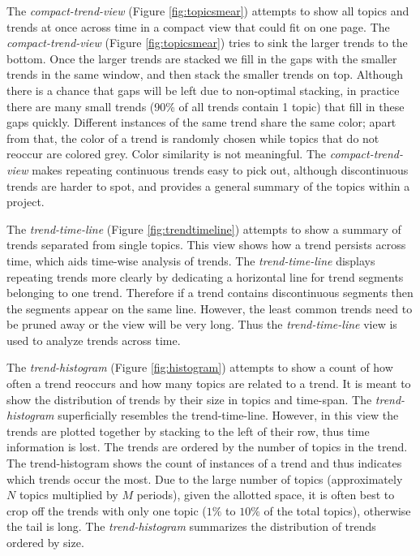 \documentclass[times, 10pt,twocolumn]{article}
\begin{document}
 The \emph{compact-trend-view} (Figure \ref{fig:topicsmear})
  attempts to show all topics and trends at once across time in a
  compact view that could fit on one page.   The
\emph{compact-trend-view} (Figure \ref{fig:topicsmear}) tries to sink
the larger trends to the bottom.  Once the larger trends are stacked
we fill in the gaps with the smaller trends in the same window, and
then stack the smaller trends on top.  Although there is a chance that
gaps will be left due to non-optimal stacking, in practice there are
many small trends (90\% of all trends contain 1 topic) that fill in
these gaps quickly.  Different instances of the same trend share the
same color; apart from that, the color of a trend is randomly chosen
while topics that do not reoccur are colored grey.
Color similarity is not meaningful.  
The \emph{compact-trend-view} makes repeating
continuous trends easy to pick out, although discontinuous trends are
harder to spot, and provides a general summary of the topics within a project.

The \emph{trend-time-line} (Figure \ref{fig:trendtimeline})
attempts to show a summary of trends separated from single topics. This view shows how a trend persists across time, which aids time-wise analysis of trends.
The \emph{trend-time-line} displays repeating trends more clearly by
dedicating a horizontal line for trend segments belonging to one
trend. Therefore if a trend contains discontinuous segments then
the segments appear on the same line.  However, the least common
trends need to be pruned away or the view will be very long. 
Thus the \emph{trend-time-line} view is used to analyze trends across time.

 The \emph{trend-histogram} (Figure \ref{fig:histogram}) attempts
  to show a count of how often a trend reoccurs and how many topics
  are related to a trend. It is meant to show the distribution of
  trends by their size in topics and time-span.  The
\emph{trend-histogram} superficially resembles the trend-time-line.
However, in this view the trends are plotted together by stacking to
the left of their row, thus time information is lost.  The trends are
ordered by the number of topics in the trend.  The trend-histogram
shows the count of instances of a trend and thus indicates which
trends occur the most. Due to the large number of topics
(approximately $N$ topics multiplied by $M$ periods), given the
allotted space, it is often best to crop off the trends with only one
topic ($1\%$ to $10\%$ of the total topics), otherwise the tail is
long. The \emph{trend-histogram} summarizes the distribution of
trends ordered by size.
\end{document}
